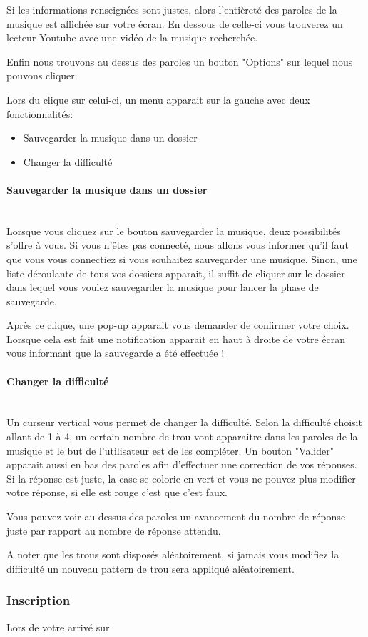 \documentclass[12pt,french]{article}
\begin{document}
Si les informations renseignées sont justes, alors l'entièreté des paroles de la musique est affichée sur votre écran. En dessous de celle-ci vous trouverez un lecteur Youtube avec une vidéo de la musique recherchée.

\medskip

Enfin nous trouvons au dessus des paroles un bouton "Options" sur lequel nous pouvons cliquer.

Lors du clique sur celui-ci, un menu apparait sur la gauche avec deux fonctionnalités:

\begin{itemize}
	\item Sauvegarder la musique dans un dossier
	\item Changer la difficulté
\end{itemize}

\paragraph{Sauvegarder la musique dans un dossier \\\\}

Lorsque vous cliquez sur le bouton sauvegarder la musique, deux possibilités s'offre à vous. Si vous n'êtes pas connecté, nous allons vous informer qu'il faut que vous vous connectiez si vous souhaitez sauvegarder une musique. Sinon, une liste déroulante de tous vos dossiers apparait, il suffit de cliquer sur le dossier dans lequel vous voulez sauvegarder la musique pour lancer la phase de sauvegarde.

Après ce clique, une pop-up apparait vous demander de confirmer votre choix. Lorsque cela est fait une notification apparait en haut à droite de votre écran vous informant que la sauvegarde a été effectuée !

\paragraph{Changer la difficulté\\\\}

Un curseur vertical vous permet de changer la difficulté. Selon la difficulté choisit allant de 1 à 4, un certain nombre de trou vont apparaitre dans les paroles de la musique et le but de l'utilisateur est de les compléter. Un bouton "Valider" apparait aussi en bas des paroles afin d'effectuer une correction de vos réponses. Si la réponse est juste, la case se colorie en vert et vous ne pouvez plus modifier votre réponse, si elle est rouge c'est que c'est faux.

Vous pouvez voir au dessus des paroles un avancement du nombre de réponse juste par rapport au nombre de réponse attendu.

A noter que les trous sont disposés aléatoirement, si jamais vous modifiez la difficulté un nouveau pattern de trou sera appliqué aléatoirement.

\subsubsection{Inscription}

Lors de votre arrivé sur 
\end{document}

